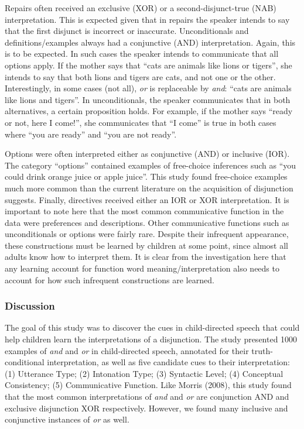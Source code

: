\documentclass[floatsintext,man]{apa6}
\theoremstyle{definition}
\theoremstyle{definition}
\theoremstyle{definition}
\theoremstyle{remark}
\begin{document}
Repairs often received an exclusive (XOR) or a second-disjunct-true
(NAB) interpretation. This is expected given that in repairs the speaker
intends to say that the first disjunct is incorrect or inaccurate.
Unconditionals and definitions/examples always had a conjunctive (AND)
interpretation. Again, this is to be expected. In such cases the speaker
intends to communicate that all options apply. If the mother says that
\enquote{cats are animals like lions or tigers}, she intends to say that
both lions and tigers are cats, and not one or the other. Interestingly,
in some cases (not all), \emph{or} is replaceable by \emph{and}:
\enquote{cats are animals like lions and tigers}. In unconditionals, the
speaker communicates that in both alternatives, a certain proposition
holds. For example, if the mother says \enquote{ready or not, here I
come!}, she communicates that \enquote{I come} is true in both cases
where \enquote{you are ready} and \enquote{you are not ready}.

Options were often interpreted either as conjunctive (AND) or inclusive
(IOR). The category \enquote{options} contained examples of free-choice
inferences such as \enquote{you could drink orange juice or apple
juice}. This study found free-choice examples much more common than the
current literature on the acquisition of disjunction suggests. Finally,
directives received either an IOR or XOR interpretation. It is important
to note here that the most common communicative function in the data
were preferences and descriptions. Other communicative functions such as
unconditionals or options were fairly rare. Despite their infrequent
appearance, these constructions must be learned by children at some
point, since almost all adults know how to interpret them. It is clear
from the investigation here that any learning account for function word
meaning/interpretation also needs to account for how such infrequent
constructions are learned.

\subsubsection{Discussion}\label{discussion}

The goal of this study was to discover the cues in child-directed speech
that could help children learn the interpretations of a disjunction. The
study presented 1000 examples of \emph{and} and \emph{or} in
child-directed speech, annotated for their truth-conditional
interpretation, as well as five candidate cues to their interpretation:
(1) Utterance Type; (2) Intonation Type; (3) Syntactic Level; (4)
Conceptual Consistency; (5) Communicative Function. Like Morris (2008),
this study found that the most common interpretations of \emph{and} and
\emph{or} are conjunction AND and exclusive disjunction XOR
respectively. However, we found many inclusive and conjunctive instances
of \emph{or} as well.
\end{document}
